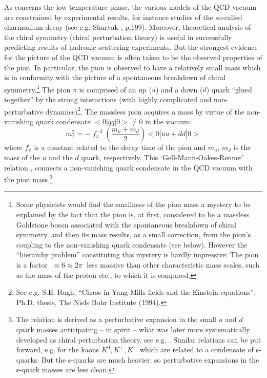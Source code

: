 \documentclass[12pt]{article}
\begin{document}
As concerns the low temperature phase, the various models of the
QCD vacuum are constrained by experimental results, for instance
studies of the so-called charmonium decay (see e.g. Shuryak
\cite{shuryak88}, p.199). Moreover, theoretical analysis of the
chiral symmetry (chiral perturbation theory) is useful in
successfully predicting results of hadronic scattering experiments.
But the strongest evidence for the picture of the QCD vacuum is
often taken to be the observed properties of the pion. In
particular, the pion is observed to have a relatively small mass
which is in conformity with the picture of a spontaneous breakdown
of chiral symmetry.\footnote{Some physicists would find the
smallness of the pion mass a mystery to be explained by the fact
that the pion is, at first, considered to be a massless Goldstone
boson associated with the spontaneous breakdown of chiral
symmetry, and then its mass results, as a small correction, from
the pion's coupling to the non-vanishing quark condensate (see
below). However the ``hierarchy problem'' constituting this
mystery is hardly impressive: The pion is a factor $\; \approx 6
\approx 2 \pi \; $ less massive than other characteristic mass
scales, such as the mass of the proton etc., to which it is
compared.} The pion $\pi$ is comprised of an up ($u$) and a down
($d$) quark ``glued together'' by the strong interactions (with
highly complicated and non-perturbative dynamics)\footnote{See
e.g. S.E. Rugh, ``Chaos in Yang-Mills fields and the Einstein
equations'', Ph.D. thesis, The Niels Bohr Institute (1994).}. The
massless pion acquires a mass by virtue of the non-vanishing quark
condensate $< 0 | \bar{q} q | 0 > \neq 0$ in the vacuum:
\begin{equation} \label{GOR}
m_{\pi}^2 = - \; f_{\pi}^{-2} \; (\frac{m_u + m_d}{2})
< 0 | \bar{u} u + \bar{d} d | 0 >
\end{equation}
where $f_{\pi}$ is a constant related to the decay time of the
pion and $m_{u}$, $m_{d}$ is the mass of the $u$ and the $d$
quark, respectively. This `Gell-Mann-Oakes-Renner' relation
\cite{gellmann68,koch97}, connects a non-vanishing quark
condensate in the QCD vacuum with the pion mass.\footnote{The
relation is derived as a perturbative expansion in the small $u$
and $d$ quark masses anticipating -- in spirit -- what was later
more systematically developed as chiral perturbation theory, see
e.g. \cite{leutwyler94}. Similar relations can be put forward,
e.g. for the kaons $K^{0}, K^{+}, K^{-}$ which are related to a
condensate of s-quarks. But the s-quarks are much heavier, so
perturbative expansions in the s-quark masses are less clean.}
\end{document}
